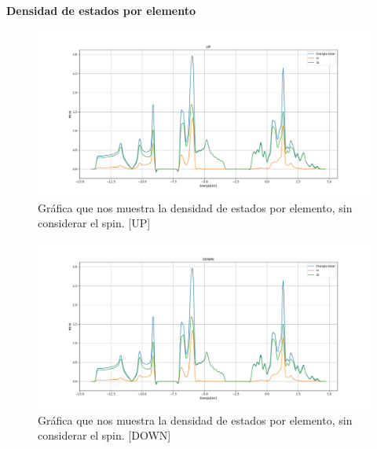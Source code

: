 \begin{frame}
    \textbf{Densidad de estados por elemento}
    \begin{figure}[H]
        \centering
        \includegraphics[scale=0.3]{images_silicano/Densidad_estados_con_spin_up_elementos.png}
        \caption{Gráfica que nos muestra la densidad de estados por elemento, sin considerar el spin. [UP]}
    \end{figure}
\end{frame}

\begin{frame}
    \begin{figure}[H]
        \centering
        \includegraphics[scale=0.3]{images_silicano/Densidad_estados_con_spin_down_elementos.png}
        \caption{Gráfica que nos muestra la densidad de estados por elemento, sin considerar el spin. [DOWN]}
    \end{figure}    
\end{frame}